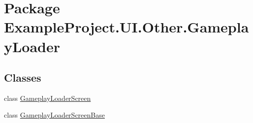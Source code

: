 \hypertarget{namespace_example_project_1_1_u_i_1_1_other_1_1_gameplay_loader}{}\section{Package Example\+Project.\+U\+I.\+Other.\+Gameplay\+Loader}
\label{namespace_example_project_1_1_u_i_1_1_other_1_1_gameplay_loader}
\subsection*{Classes}
\begin{DoxyCompactItemize}
\item 
class \hyperlink{class_example_project_1_1_u_i_1_1_other_1_1_gameplay_loader_1_1_gameplay_loader_screen}{Gameplay\+Loader\+Screen}
\item 
class \hyperlink{class_example_project_1_1_u_i_1_1_other_1_1_gameplay_loader_1_1_gameplay_loader_screen_base}{Gameplay\+Loader\+Screen\+Base}
\end{DoxyCompactItemize}
